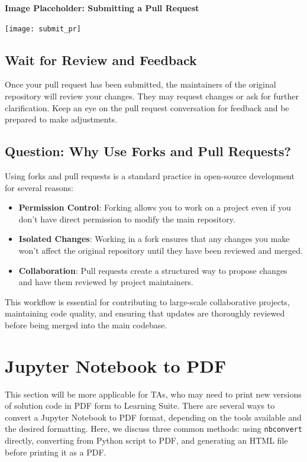 \documentclass{article}
\begin{document}
\noindent \textbf{Image Placeholder: Submitting a Pull Request}  
\begin{center}
    \texttt{[image: submit\_pr]} %
\end{center}

\subsection{Wait for Review and Feedback}

Once your pull request has been submitted, the maintainers of the original repository will review your changes. They may request changes or ask for further clarification. Keep an eye on the pull request conversation for feedback and be prepared to make adjustments.


\subsection{Question: Why Use Forks and Pull Requests?}
Using forks and pull requests is a standard practice in open-source development for several reasons:
\begin{itemize}
    \item \textbf{Permission Control}: Forking allows you to work on a project even if you don't have direct permission to modify the main repository.
    \item \textbf{Isolated Changes}: Working in a fork ensures that any changes you make won’t affect the original repository until they have been reviewed and merged.
    \item \textbf{Collaboration}: Pull requests create a structured way to propose changes and have them reviewed by project maintainers.
\end{itemize}

This workflow is essential for contributing to large-scale collaborative projects, maintaining code quality, and ensuring that updates are thoroughly reviewed before being merged into the main codebase.


\section{Jupyter Notebook to PDF}

This section will be more applicable for TAs, who may need to print new versions of solution code in PDF form to Learning Suite.
\newline
\newline
There are several ways to convert a Jupyter Notebook to PDF format, depending on the tools available and the desired formatting. Here, we discuss three common methods: using \texttt{nbconvert} directly, converting from Python script to PDF, and generating an HTML file before printing it as a PDF.
\end{document}
